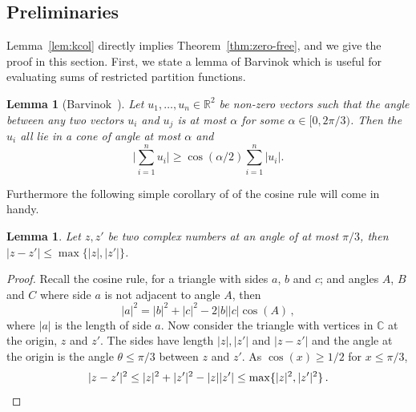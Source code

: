 \documentclass[10pt,a4paper]{article}
\newtheorem{lemma}[theorem]{Lemma}
\theoremstyle{definition}
\newcommand*{\CC}{\mathbb{C}}
\newcommand*{\RR}{\mathbb{R}}
\begin{document}
\subsection{Preliminaries}
%
Lemma~\ref{lem:kcol} directly implies Theorem~\ref{thm:zero-free}, and we give the proof in this section.
%
%
First, we state a lemma of Barvinok which is useful for evaluating sums of restricted partition functions.
\begin{lemma}[{Barvinok~\cite[Lemma 3.6.3]{Barvinok16}}]
 \label{lem:cone}
 Let $u_1, \ldots, u_n \in \RR^2$ be non-zero vectors such that the angle between any two vectors $u_i$ and $u_j$ is at most $\alpha$ for some $\alpha \in [0,2\pi/3)$.
 Then the $u_i$ all lie in a cone of angle at most $\alpha$ and
 \[
 \bigg| \sum_{i=1}^n u_i \bigg| \geq \cos(\alpha/2) \sum_{i=1}^n |u_i|.
 \]
\end{lemma}
\noindent
Furthermore the following simple corollary of of the cosine rule will come in handy.
\begin{lemma}
\label{lem:smallanglediff}
 Let $z, z'$ be two complex numbers at an angle of at most $\pi/3$, then $|z-z'| \leq \max \{ |z|, |z'| \}$.
\end{lemma}
\begin{proof}
 Recall the cosine rule, for a triangle with sides $a$, $b$ and $c$; and angles $A$, $B$ and $C$ where side $a$ is not adjacent to angle $A$, then
 \[
 |a|^2 = |b|^2 + |c|^2 -2|b||c| \cos(A)\,,
 \]
 where $|a|$ is the length of side $a$.
 Now consider the triangle with vertices in $\CC$ at the origin, $z$ and $z'$.
 The sides have length $|z|, |z'|$ and $|z-z'|$ and the angle at the origin is the angle $\theta \leq \pi/3$ between $z$ and $z'$.
 As $\cos(x) \geq 1/2$ for $x \leq \pi/3$,
 \[
 |z-z'|^2 \leq |z|^2+|z'|^2-|z||z'| \leq \max\{|z|^2,|z'|^2\}\,.\qedhere
 \]
\end{proof}
 
\end{document}
